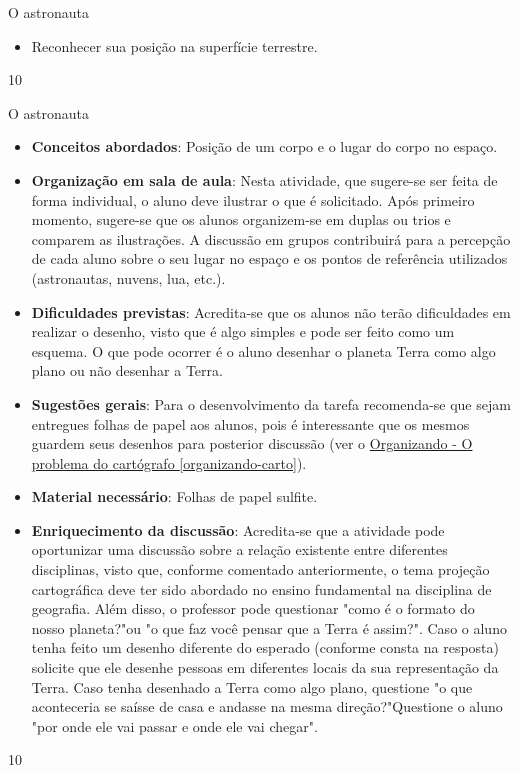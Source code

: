 {\vspace{2em}
\begin{objectives}{O astronauta}
{
\begin{itemize}
\item Reconhecer sua posição na superfície terrestre.

\end{itemize}
}
{1}{0}
\end{objectives}
\begin{sugestions}{O astronauta}
{
	\begin{itemize}
	\item \textbf{Conceitos abordados}: Posição de um corpo e o  lugar do corpo no espaço.
	
	\item \textbf{Organização em sala de aula}: Nesta atividade, que sugere-se ser feita de forma individual, o aluno deve ilustrar o que é solicitado. Após primeiro momento, sugere-se que os alunos organizem-se em duplas ou trios e comparem as ilustrações. A discussão em grupos contribuirá para a percepção de cada aluno sobre o seu lugar no espaço e os pontos de referência utilizados (astronautas, nuvens, lua, etc.).
	\item \textbf{Dificuldades previstas}: Acredita-se que os alunos não terão dificuldades em realizar o desenho, visto que é algo simples e pode ser feito como um esquema. O que pode ocorrer é o aluno desenhar o planeta Terra como algo plano ou não desenhar a Terra.
	\item \textbf{Sugestões gerais}: Para o desenvolvimento da tarefa recomenda-se que sejam entregues folhas de papel aos alunos, pois é interessante que os mesmos guardem seus desenhos para posterior discussão (ver o  \hyperref[organizando-carto]{Organizando - O problema do cartógrafo \ref{organizando-carto}}).
	\item \textbf{Material necessário}: Folhas de papel sulfite.
	\item \textbf{Enriquecimento da discussão}: Acredita-se que a atividade pode oportunizar uma discussão sobre a relação existente entre diferentes disciplinas, visto que, conforme comentado anteriormente, o tema projeção cartográfica deve ter sido abordado no ensino fundamental na disciplina de geografia. Além disso, o professor pode questionar "como é o formato do nosso planeta?"{}ou "o que faz você pensar que a Terra é assim?". Caso o aluno tenha feito um desenho diferente do esperado (conforme consta na resposta) solicite que ele desenhe pessoas em diferentes locais da sua representação da Terra. Caso tenha desenhado a Terra como algo plano, questione "o que aconteceria se saísse de casa e andasse na mesma direção?"{}Questione o aluno "por onde ele vai passar e onde ele vai chegar".
	\end{itemize}
}{1}{0}
\end{sugestions}}


